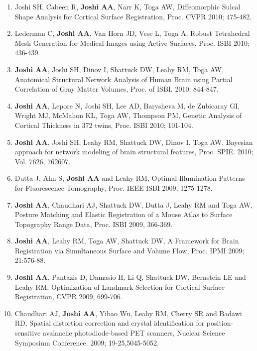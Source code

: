 \documentclass[overlapped,line,letterpaper]{res}
\begin{document}
\begin{resume}
\begin{enumerate}
    \item Joshi SH, Cabeen R, \textbf{Joshi AA}, Narr K, Toga AW, {Diffeomorphic Sulcal Shape Analysis for Cortical Surface Registration}, Proc. CVPR 2010; 475-482.

    \item Lederman C, \textbf{Joshi AA}, Van Horn JD, Vese L, Toga A, {Robust Tetrahedral Mesh Generation for Medical Images using Active Surfaces}, Proc. ISBI 2010; 436-439.

    \item \textbf{Joshi AA}, Joshi SH, Dinov I, Shattuck DW, Leahy RM, Toga AW, {Anatomical Structural Network Analysis of Human Brain using Partial Correlation of Gray Matter Volumes}, Proc. of ISBI. 2010; 844-847.

    \item \textbf{Joshi AA}, Lepore N, Joshi SH, Lee AD, Barysheva M, de Zubicaray GI, Wright MJ, McMahon KL, Toga AW, Thompson PM, {Genetic Analysis of Cortical Thickness in 372 twins}, Proc. ISBI 2010; 101-104.

    \item \textbf{Joshi AA}, Joshi SH, Leahy RM, Shattuck DW, Dinov I, Toga AW, {Bayesian approach for network modeling of brain structural features}, Proc. SPIE. 2010; Vol. 7626, 762607.

    \item Dutta J, Ahn S, \textbf{Joshi AA} and Leahy RM, {Optimal Illumination Patterns for Fluorescence Tomography}, Proc. IEEE ISBI 2009, 1275-1278.

    \item \textbf{Joshi AA}, Chaudhari AJ, Shattuck DW, Dutta J, Leahy RM and Toga AW, {Posture Matching and Elastic Registration of a Mouse Atlas to Surface Topography Range Data}, Proc. ISBI 2009, 366-369.

    \item \textbf{Joshi AA}, Leahy RM, Toga AW, Shattuck DW, {A Framework for Brain Registration via Simultaneous Surface and Volume Flow}, Proc. IPMI 2009; 21:576-88.

    \item \textbf{Joshi AA}, Pantazis D, Damasio H, Li Q, Shattuck DW, Bernstein LE and Leahy RM, {Optimization of Landmark Selection for Cortical Surface Registration}, CVPR 2009, 699-706. 

    \item Chaudhari AJ, \textbf{Joshi AA}, Yibao Wu, Leahy RM, Cherry SR and Badawi RD, {Spatial distortion correction and crystal identification for position-sensitive avalanche photodiode-based PET scanners}, Nuclear Science Symposium Conference. 2009; 19-25,5045-5052.


\end{enumerate}
\end{resume}
\end{document}
